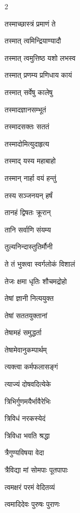 \begin{multicols}{2}
\begin{indexlist}
\item तस्माच्छास्त्रं प्रमाणं ते \dotfill {}
\item तस्मात् त्वमिन्द्रियाण्यादौ \dotfill {}
\item तस्मात् त्वमुत्तिष्ठ यशो लभस्व \dotfill {}
\item तस्मात् प्रणम्य प्रणिधाय कायं \dotfill {}
\item तस्मात् सर्वेषु कालेषु \dotfill {}
\item तस्मादज्ञानसम्भूतं \dotfill {}
\item तस्मादसक्तः सततं \dotfill {}
\item तस्मादोमित्युदाहृत्य \dotfill {}
\item तस्माद् यस्य महाबाहो \dotfill {}
\item तस्मान् नार्हा वयं हन्तुं \dotfill {}
\item तस्य सञ्जनयन् हर्षं \dotfill {}
\item तानहं द्विषतः क्रूरान् \dotfill {}
\item तानि सर्वाणि संयम्य \dotfill {}
\item तुल्यनिन्दास्तुतिर्मौनी \dotfill {}
\item ते तं भुक्त्वा स्वर्गलोकं विशालं \dotfill {}
\item तेजः क्षमा धृतिः शौचमद्रोहो \dotfill {}
\item तेषां ज्ञानी नित्ययुक्त \dotfill {}
\item तेषां सततयुक्तानां \dotfill {}
\item तेषामहं समुद्धर्ता \dotfill {}
\item तेषामेवानुकम्पार्थम् \dotfill {}
\item त्यक्त्वा कर्मफलासङ्गं \dotfill {}
\item त्याज्यं दोषवदित्येके \dotfill {}
\item त्रिभिर्गुणमयैर्भावैरेभिः \dotfill {}
\item त्रिविधं नरकस्येदं \dotfill {}
\item त्रिविधा भवति श्रद्धा \dotfill {}
\item त्रैगुण्यविषया वेदा \dotfill {}
\item त्रैविद्या मां सोमपाः पूतपापाः \dotfill {}
\item त्वमक्षरं परमं वेदितव्यं \dotfill {}
\item त्वमादिदेवः पुरुषः पुराणः \dotfill {}
\end{indexlist}


\end{multicols}
